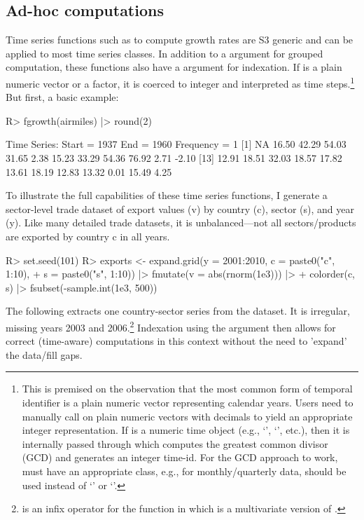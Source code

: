 \documentclass[nojss]{jss} %
\newcommand{\class}[1]{`\code{#1}'}
\newcommand{\fct}[1]{\code{#1()}}
\begin{document}
\subsection{Ad-hoc computations}
%
Time series functions such as \fct{fgrowth} to compute growth rates are S3 generic and can be applied to most time series classes. In addition to a  argument for grouped computation, these functions also have a  argument for indexation. If  is a plain numeric vector or a factor, it is coerced to integer and interpreted as time steps.\footnote{This is premised on the observation that the most common form of temporal identifier is a plain numeric vector representing calendar years. Users need to manually call  on plain numeric vectors with decimals to yield an appropriate integer representation. If  is a numeric time object (e.g., \class{Date}, \class{POSIXct}, etc.), then it is internally passed through  which computes the greatest common divisor (GCD) and generates an integer time-id. For the GCD approach to work,  must have an appropriate class, e.g., for monthly/quarterly data,  should be used instead of \class{Date} or \class{POSIXct}.} But first, a basic example:
%
\begin{Schunk}
\begin{Sinput}
R> fgrowth(airmiles) |> round(2)
\end{Sinput}
\begin{Soutput}
Time Series:
Start = 1937 
End = 1960 
Frequency = 1 
 [1]    NA 16.50 42.29 54.03 31.65  2.38 15.23 33.29 54.36 76.92  2.71 -2.10
[13] 12.91 18.51 32.03 18.57 17.82 13.61 18.19 12.83 13.32  0.01 15.49  4.25
\end{Soutput}
\end{Schunk}
To illustrate the full capabilities of these time series functions, I generate a sector-level trade dataset of export values (v) by country (c), sector (s), and year (y). Like many detailed trade datasets, it is unbalanced---not all sectors/products are exported by country c in all years.
\begin{Schunk}
\begin{Sinput}
R> set.seed(101)
R> exports <- expand.grid(y = 2001:2010, c = paste0("c", 1:10),
+    s = paste0("s", 1:10)) |> fmutate(v = abs(rnorm(1e3))) |>
+    colorder(c, s) |> fsubset(-sample.int(1e3, 500))
\end{Sinput}
\end{Schunk}
The following extracts one country-sector series from the  dataset. It is irregular, missing years 2003 and 2006.\footnote{\code{\%=\%} is an infix operator for the \fct{massign} function in  which is a multivariate version of \fct{assign}.} Indexation using the  argument then allows for correct (time-aware) computations in this context without the need to 'expand' the data/fill gaps.
\end{document}
